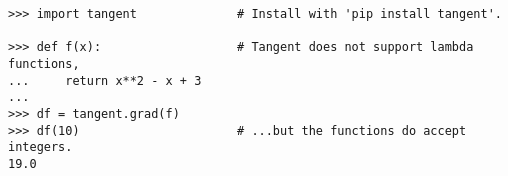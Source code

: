 \begin{lstlisting}
>>> import tangent              # Install with 'pip install tangent'.

>>> def f(x):                   # Tangent does not support lambda functions,
...     return x**2 - x + 3
...
>>> df = tangent.grad(f)
>>> df(10)                      # ...but the functions do accept integers.
19.0
\end{lstlisting}

\begin{comment} %
\subsection*{Convergence of the Centered Difference Quotient} %

Recall from the proof of Taylor's theorem that $R_k = \frac{f^{(k)}(x_0)}{k!}h^k + R_{k+1}$.
Therefore,
\begin{align*}
\frac{R_2(-h) - R_2(h)}{2h} &= \frac{1}{2h}\left(\frac{f''(x_0)}{2!}h^2 + R_{3}(-h) - \frac{f''(x_0)}{2!}h^2 - R_{3}(h) \right)\\
&= \frac{1}{2h} ( R_3(-h)-R_3(h))\\
&= \frac{1}{2h}\left(  \left( \int_0^1 \frac{(1-t)^2}{2} f'''(x_0+th) dt \right) h^3  -  \left(\int_0^1 \frac{(1-t)^2}{2} f'''(x_0-th) dt \right) h^3  \right)\\
&= \left(  \int_0^1 \frac{(1-t)^2}{4}( f'''(x_0+th)-f'''(x_0-th)) \right)h^2\\
&{\in}\hspace{0.3in}O(h^2)
\end{align*}
once $h$ is restricted to some $\delta$-neighborhood of 0.
So this centered difference quotient is of the second order and its error is smaller than using the first order forward and backward difference quotients when $|h|<1$.
\end{comment}


